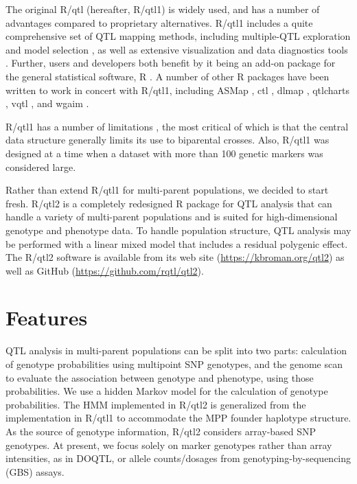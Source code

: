 \documentclass[12pt,letterpaper]{article}
\begin{document}
The original R/qtl (hereafter, R/qtl1) is widely used, and has a number of
advantages compared to proprietary alternatives. R/qtl1 includes a quite comprehensive set of QTL mapping
methods, including multiple-QTL exploration and model selection \citep{MQMpaper,broman2002,manichaikul2009}, as
well as extensive visualization
and data diagnostics tools \citep{broman_sen}. Further, users and developers both benefit by it
being an add-on package for the general statistical software, R
\citep{RCore}. A number of other R packages have been written to work in
concert with R/qtl1, including ASMap \citep{ASMap}, ctl \citep{ctl},
dlmap \citep{dlmap}, qtlcharts \citep{qtlcharts}, vqtl \citep{vqtl}, and
wgaim \citep{wgaim}.

R/qtl1 has a number of limitations
\citep[see][]{broman2014}, the most critical of which is that the
central data structure generally limits its use to biparental crosses.
Also, R/qtl1 was designed at a time when a dataset with more than 100 genetic
markers was considered large.

Rather than extend R/qtl1 for multi-parent populations, we decided to
start fresh. R/qtl2 is a completely redesigned R package for QTL
analysis that can handle a variety of multi-parent populations and is
suited for high-dimensional genotype and phenotype data. To
handle population structure, QTL analysis may be performed with a
linear mixed model that includes a residual polygenic effect. The
R/qtl2 software is available from its web site
(\url{https://kbroman.org/qtl2}) as well as GitHub
(\url{https://github.com/rqtl/qtl2}).


\clearpage
\section*{Features}

QTL analysis in multi-parent populations can be split into two parts:
calculation of genotype probabilities using multipoint SNP genotypes,
and the genome scan to evaluate the association between genotype and
phenotype, using those probabilities.
We use a hidden Markov model \citep[HMM; see][App.\ D]{broman_sen} for the calculation
of genotype probabilities.
The HMM implemented in R/qtl2 is generalized from the implementation in R/qtl1 to accommodate the
MPP founder haplotype structure.  As the source of genotype information, R/qtl2
considers array-based SNP genotypes.
At present, we focus solely on marker genotypes rather than array
intensities, as in DOQTL, or allele counts/dosages from genotyping-by-sequencing (GBS)
assays.
\end{document}
